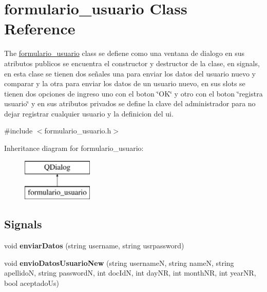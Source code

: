 \hypertarget{classformulario__usuario}{}\section{formulario\+\_\+usuario Class Reference}
\label{classformulario__usuario}


The \hyperlink{classformulario__usuario}{formulario\+\_\+usuario} class se defiene como una ventana de dialogo en sus atributos publicos se encuentra el constructor y destructor de la clase, en signals, en esta clase se tienen dos señales una para enviar los datos del usuario nuevo y comparar y la otra para enviar los datos de un usuario nuevo, en sus slots se tienen dos opciones de ingreso uno con el boton \char`\"{}\+O\+K\char`\"{} y otro con el boton \char`\"{}registra usuario\char`\"{} y en sus atributos privados se define la clave del administrador para no dejar registrar cualquier usuario y la definicion del ui.  




{\ttfamily \#include $<$formulario\+\_\+usuario.\+h$>$}

Inheritance diagram for formulario\+\_\+usuario\+:\begin{figure}[H]
\begin{center}
\leavevmode
\includegraphics[height=2.000000cm]{classformulario__usuario}
\end{center}
\end{figure}
\subsection*{Signals}
\begin{DoxyCompactItemize}
\item 
\mbox{\label{classformulario__usuario_a97c1cd74da8cc98b6ba4eb8cc6d0c5e1}} 
void {\bfseries enviar\+Datos} (string username, string usrpassword)
\item 
\mbox{\label{classformulario__usuario_a9625df01df8528888cfff9e0b7a3ce5f}} 
void {\bfseries envio\+Datos\+Usuario\+New} (string usernameN, string nameN, string apellidoN, string passwordN, int doc\+IdN, int day\+NR, int month\+NR, int year\+NR, bool aceptado\+Us)
\end{DoxyCompactItemize}
